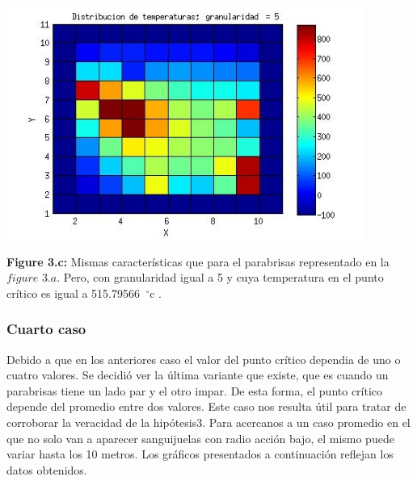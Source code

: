 \includegraphics[width=\textwidth,height=3.0in,keepaspectratio
]{r7h5.jpg} \newline
\begin {flushleft}
\textbf{Figure 3.c:} Mismas características que para el parabrisas representado en la $figure$ $3.a$. Pero, con granularidad igual a 5 y cuya temperatura en el punto crítico es igual a 515.79566\hspace{-1.5mm}$\phantom{a}^{\circ}$c .
\end{flushleft}


\subsubsection{Cuarto caso}


Debido a que en los anteriores caso el valor del punto crítico dependia de uno o cuatro valores. Se decidió ver la última variante que existe, que es cuando un parabrisas tiene un lado par y el otro impar. De esta forma, el punto crítico depende del promedio entre dos valores. \newline
Este caso nos resulta útil para tratar de corroborar la veracidad de la hipótesis3. Para acercanos a un caso promedio en el que no solo van a aparecer sanguijuelas con radio acción bajo, el mismo puede variar hasta los 10 metros. Los gráficos presentados a continuación reflejan los datos obtenidos.    

